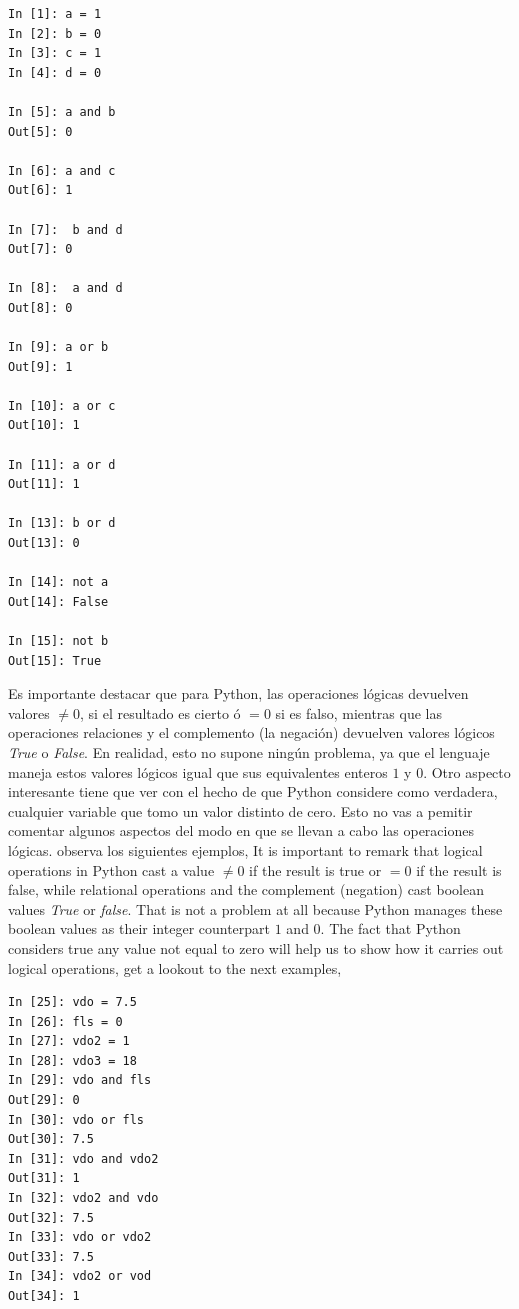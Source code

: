 \begin{center}
\begin{minipage}{.2\textwidth}
\begin{verbatim}
In [1]: a = 1
In [2]: b = 0
In [3]: c = 1
In [4]: d = 0

In [5]: a and b
Out[5]: 0

In [6]: a and c
Out[6]: 1

In [7]:  b and d
Out[7]: 0

In [8]:  a and d
Out[8]: 0

In [9]: a or b
Out[9]: 1

In [10]: a or c
Out[10]: 1

In [11]: a or d
Out[11]: 1

In [13]: b or d
Out[13]: 0

In [14]: not a
Out[14]: False

In [15]: not b
Out[15]: True
\end{verbatim}
\end{minipage}
\end{center}

\begin{paracol}{2}
Es importante destacar que para Python, las operaciones lógicas devuelven valores $\neq 0$, si el resultado es cierto ó $=0$ si es falso, mientras que las operaciones relaciones y el complemento (la negación) devuelven valores lógicos \emph{True} o \emph{False}. En realidad, esto no supone ningún problema, ya que el lenguaje maneja estos valores lógicos igual que sus equivalentes enteros $1$ y $0$. Otro aspecto interesante tiene que ver con el hecho de que Python considere como verdadera, cualquier variable que tomo un valor distinto de cero. Esto no vas a pemitir comentar algunos aspectos del modo en que se llevan a cabo las operaciones lógicas. observa los siguientes ejemplos,
\switchcolumn
It is important to remark that logical operations in Python cast a value $\neq 0$ if the result is true or $=0$ if the result is false, while relational operations and the complement (negation) cast boolean values \emph{True} or \emph{false}. That is not a problem at all because Python manages these boolean values as their integer counterpart $1$ and $0$. The fact that Python considers true any value not equal to zero will help us to show how it carries out logical operations, get a lookout to the next examples,  
\end{paracol}

\begin{center}
    \begin{minipage}{.2\textwidth}
\begin{verbatim}
In [25]: vdo = 7.5
In [26]: fls = 0
In [27]: vdo2 = 1
In [28]: vdo3 = 18
In [29]: vdo and fls
Out[29]: 0
In [30]: vdo or fls
Out[30]: 7.5
In [31]: vdo and vdo2
Out[31]: 1
In [32]: vdo2 and vdo
Out[32]: 7.5
In [33]: vdo or vdo2
Out[33]: 7.5
In [34]: vdo2 or vod
Out[34]: 1
\end{verbatim}
    \end{minipage}
\end{center}

